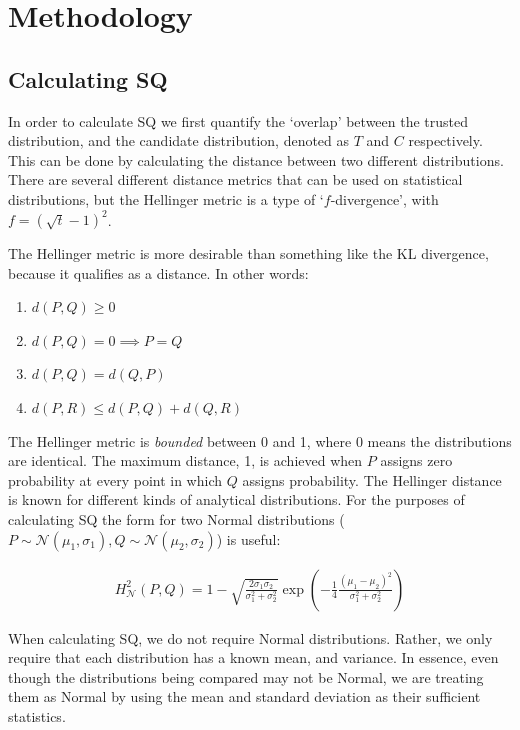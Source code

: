 \section{Methodology}
\subsection{Calculating SQ}
In order to calculate SQ we first quantify the `overlap' between the trusted distribution, and the candidate distribution, denoted as $T$ and $C$ respectively. This can be done by calculating the distance between two different distributions. There are several different distance metrics that can be used on statistical distributions, but the Hellinger metric is a type of `$f$-divergence', with $f=(\sqrt{t}-1)^2$.

The Hellinger metric is more desirable than something like the KL divergence, because it qualifies as a distance. In other words:

\begin{enumerate}
    \item $d(P,Q) \geq 0$
    \item $d(P,Q) = 0 \implies P=Q$
    \item $d(P,Q) = d(Q,P)$
    \item $d(P,R) \leq d(P,Q) + d(Q,R)$
\end{enumerate}

The Hellinger metric is \emph{bounded} between 0 and 1, where 0 means the distributions are identical. The maximum distance, 1, is achieved when $P$ assigns zero probability at every point in which $Q$ assigns probability. The Hellinger distance is known for different kinds of analytical distributions. For the purposes of calculating SQ the form for two Normal distributions ($P \sim \mathcal{N}(\mu_1,\sigma_1), Q\sim\mathcal{N}(\mu_2,\sigma_2)$) is useful:

\begin{align}
    H_{\mathcal{N}}^{2}(P,Q) = 1-\sqrt{\frac{2\sigma_1\sigma_2}{\sigma_1^2+\sigma_2^2}}\exp{\left(-\frac{1}{4}\frac{(\mu_1-\mu_2)^2}{\sigma_1^2+\sigma_2^2}\right)}
\end{align}

When calculating SQ, we do not require Normal distributions. Rather, we only require that each distribution has a known mean, and variance. In essence, even though the distributions being compared may not be Normal, we are treating them as Normal by using the mean and standard deviation as their sufficient statistics.

